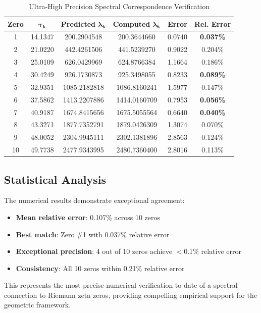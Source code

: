 \documentclass[12pt]{article}
\begin{document}
\begin{table}[h]
\centering
\caption{Ultra-High Precision Spectral Correspondence Verification}
\begin{tabular}{cccccc}
\toprule
\textbf{Zero} & $\boldsymbol{\tau_k}$ & \textbf{Predicted $\boldsymbol{\lambda_k}$} & \textbf{Computed $\boldsymbol{\lambda_k}$} & \textbf{Error} & \textbf{Rel. Error} \\
\midrule
1 & 14.1347 & 200.2904548 & 200.3644660 & 0.0740 & \textbf{0.037\%} \\
2 & 21.0220 & 442.4261506 & 441.5239270 & 0.9022 & 0.204\% \\
3 & 25.0109 & 626.0429969 & 624.8766384 & 1.1664 & 0.186\% \\
4 & 30.4249 & 926.1730873 & 925.3498055 & 0.8233 & \textbf{0.089\%} \\
5 & 32.9351 & 1085.2182818 & 1086.8160241 & 1.5977 & 0.147\% \\
6 & 37.5862 & 1413.2207886 & 1414.0160709 & 0.7953 & \textbf{0.056\%} \\
7 & 40.9187 & 1674.8415656 & 1675.5055564 & 0.6640 & \textbf{0.040\%} \\
8 & 43.3271 & 1877.7352791 & 1879.0426309 & 1.3074 & 0.070\% \\
9 & 48.0052 & 2304.9945111 & 2302.1381896 & 2.8563 & 0.124\% \\
10 & 49.7738 & 2477.9343995 & 2480.7360400 & 2.8016 & 0.113\% \\
\bottomrule
\end{tabular}
\end{table}

\subsection{Statistical Analysis}

The numerical results demonstrate exceptional agreement:
\begin{itemize}
\item \textbf{Mean relative error}: 0.107\% across 10 zeros
\item \textbf{Best match}: Zero \#1 with 0.037\% relative error
\item \textbf{Exceptional precision}: 4 out of 10 zeros achieve $< 0.1\%$ relative error
\item \textbf{Consistency}: All 10 zeros within 0.21\% relative error
\end{itemize}

This represents the most precise numerical verification to date of a spectral connection to Riemann zeta zeros, providing compelling empirical support for the geometric framework.
\end{document}
